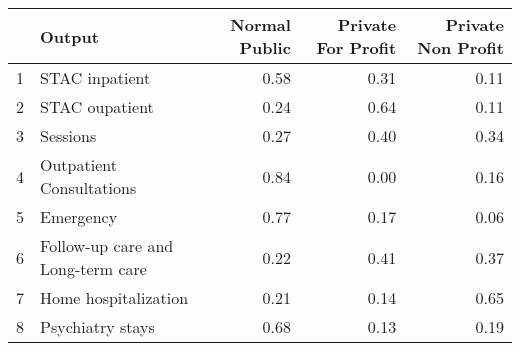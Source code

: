 \begin{tabular}{rlrrr}
  \toprule
 & Output & Normal Public & Private For Profit & Private Non Profit \\ 
  \midrule
1 & STAC inpatient & 0.58 & 0.31 & 0.11 \\ 
  2 & STAC oupatient & 0.24 & 0.64 & 0.11 \\ 
  3 & Sessions & 0.27 & 0.40 & 0.34 \\ 
  4 & Outpatient Consultations & 0.84 & 0.00 & 0.16 \\ 
  5 & Emergency & 0.77 & 0.17 & 0.06 \\ 
  6 & Follow-up care and Long-term care & 0.22 & 0.41 & 0.37 \\ 
  7 & Home hospitalization & 0.21 & 0.14 & 0.65 \\ 
  8 & Psychiatry stays & 0.68 & 0.13 & 0.19 \\ 
   \bottomrule
\end{tabular}
